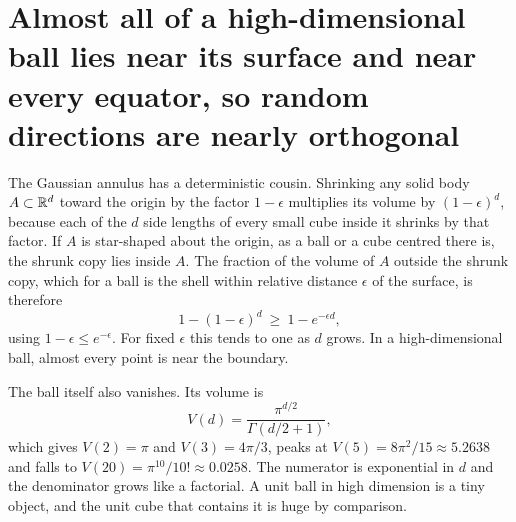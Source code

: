 
\section{Almost all of a high-dimensional ball lies near its surface and near every equator, so random directions are nearly orthogonal}\label{sec:ch11:ball}

The Gaussian annulus has a deterministic cousin. Shrinking any solid body $A\subset\mathbb{R}^d$ toward the origin by the factor $1-\epsilon$ multiplies its volume by $(1-\epsilon)^d$, because each of the $d$ side lengths of every small cube inside it shrinks by that factor. If $A$ is star-shaped about the origin, as a ball or a cube centred there is, the shrunk copy lies inside $A$. The fraction of the volume of $A$ outside the shrunk copy, which for a ball is the shell within relative distance $\epsilon$ of the surface, is therefore
\begin{equation}\label{eq:ch11:shell}
1-(1-\epsilon)^d\ \ge\ 1-e^{-\epsilon d},
\end{equation}
using $1-\epsilon\le e^{-\epsilon}$. For fixed $\epsilon$ this tends to one as $d$ grows. In a high-dimensional ball, almost every point is near the boundary.

The ball itself also vanishes. Its volume is
\begin{equation}\label{eq:ch11:volume}
V(d)=\frac{\pi^{d/2}}{\Gamma(d/2+1)},
\end{equation}
which gives $V(2)=\pi$ and $V(3)=4\pi/3$, peaks at $V(5)=8\pi^2/15\approx5.2638$ and falls to $V(20)=\pi^{10}/10!\approx0.0258$. The numerator is exponential in $d$ and the denominator grows like a factorial. A unit ball in high dimension is a tiny object, and the unit cube that contains it is huge by comparison.

